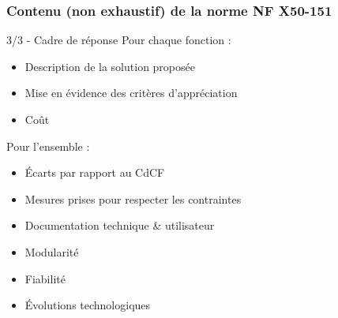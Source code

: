 \begin{frame}
\frametitle{Contenu (non exhaustif) de la norme NF X50-151}

\begin{exampleblock}{3/3 - Cadre de réponse}
Pour chaque fonction :
\begin{itemize}
    \item Description de la solution proposée
    \item Mise en évidence des critères d'appréciation
    \item Coût
\end{itemize}
Pour l'ensemble :
\begin{itemize}
    \item Écarts par rapport au CdCF
    \item Mesures prises pour respecter les contraintes
    \item Documentation technique \& utilisateur
    \item Modularité
    \item Fiabilité
    \item Évolutions technologiques
\end{itemize}
\end{exampleblock}

\end{frame} %

